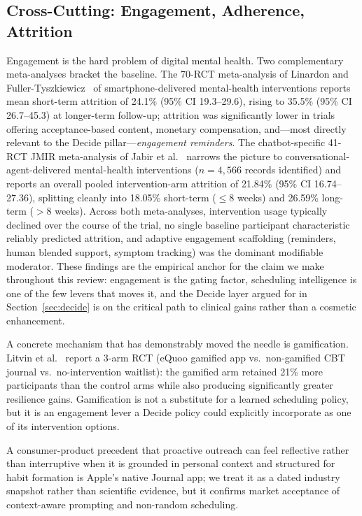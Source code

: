\documentclass[11pt,a4paper]{article}
\newcommand{\secref}[1]{Section~\ref{#1}}
\begin{document}
\subsection{Cross-Cutting: Engagement, Adherence, Attrition}\label{sec:engagement}

Engagement is the hard problem of digital mental health. Two
complementary meta-analyses bracket the baseline. The
70-RCT meta-analysis of Linardon and
Fuller-Tyszkiewicz~\cite{Linardon2020Attrition} of
smartphone-delivered mental-health interventions reports mean
short-term attrition of 24.1\% (95\% CI 19.3--29.6), rising to
35.5\% (95\% CI 26.7--45.3) at longer-term follow-up; attrition
was significantly lower in trials offering acceptance-based
content, monetary compensation, and---most directly relevant to
the Decide pillar---\emph{engagement reminders}. The
chatbot-specific 41-RCT JMIR meta-analysis of Jabir et
al.~\cite{Jabir2024AttritionMeta} narrows the picture to
conversational-agent-delivered mental-health interventions
($n=4{,}566$ records identified) and reports an overall pooled
intervention-arm attrition of 21.84\% (95\% CI 16.74--27.36),
splitting cleanly into 18.05\% short-term ($\le\!8$ weeks) and
26.59\% long-term ($>\!8$ weeks). Across both meta-analyses,
intervention usage typically declined over the course of the
trial, no single baseline participant characteristic reliably
predicted attrition, and adaptive engagement scaffolding (reminders,
human blended support, symptom tracking) was the dominant
modifiable moderator. These findings are the empirical anchor for
the claim we make throughout this review: engagement is the gating
factor, scheduling intelligence is one of the few levers that
moves it, and the Decide layer argued for in \secref{sec:decide}
is on the critical path to clinical gains rather than a cosmetic
enhancement.

A concrete mechanism that has demonstrably moved the needle is
gamification. Litvin et al.~\cite{Litvin2020Gamification} report a
3-arm RCT (eQuoo gamified app vs.\ non-gamified CBT journal vs.\
no-intervention waitlist): the gamified arm retained 21\% more
participants than the control arms while also producing
significantly greater resilience gains. Gamification is not a
substitute for a learned scheduling policy, but it is an
engagement lever a Decide policy could explicitly incorporate as
one of its intervention options.

A consumer-product precedent that proactive outreach can feel
reflective rather than interruptive when it is grounded in
personal context and structured for habit formation is Apple's
native Journal app; we treat it as a dated industry snapshot
rather than scientific evidence, but it confirms market acceptance
of context-aware prompting and non-random scheduling.
\end{document}
